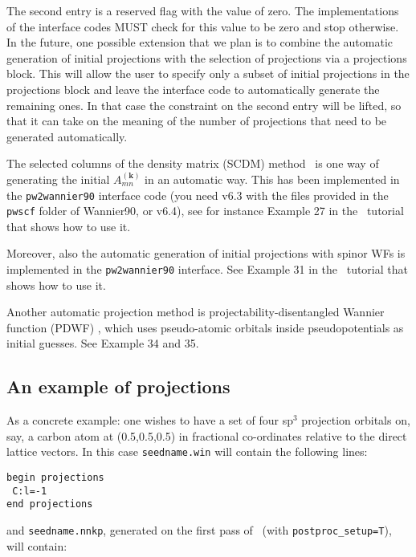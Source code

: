The second entry is a reserved flag with the value of zero. The implementations of the interface codes MUST check for this value to be zero and stop otherwise. In the future, one possible extension that we plan is to combine the automatic generation of initial projections with the selection of projections via a projections block. This will allow the user to specify only a subset of initial projections in the projections block and leave the interface code to automatically generate the remaining ones. In that case the constraint on the second entry will be lifted, so that it can take on the meaning of the number of projections that need to be generated automatically.

The selected columns of the density matrix (SCDM) method~\cite{LinLin-ArXiv2017} is one way of generating the initial $A_{mn}^{(\mathbf{k})}$ in an automatic way. This has been implemented in the {\tt pw2wannier90} interface code (you need v6.3 with the files provided in the \texttt{pwscf} folder of Wannier90, or v6.4), see for instance Example 27 in the \wannier\ tutorial that shows how to use it.

Moreover, also the automatic generation of initial projections with spinor WFs is implemented in the {\tt pw2wannier90} interface. See Example 31 in the \wannier\ tutorial that shows how to use it.

Another automatic projection method is projectability-disentangled Wannier function (PDWF) \cite{Qiao2023-pdwf}, which uses pseudo-atomic orbitals inside pseudopotentials as initial guesses.
See Example 34 and 35.



\subsection{An example of projections}\label{sec:proj_example}

As a concrete example: one wishes to have a set of four sp$^3$ projection
orbitals on, say, a carbon atom at (0.5,0.5,0.5) in fractional
co-ordinates relative to the direct lattice vectors. In this case
\verb#seedname.win# will contain the following lines:

\begin{verbatim}
begin projections
 C:l=-1
end projections
\end{verbatim}

and \verb#seedname.nnkp#, generated on the first pass of
\wannier\ (with \verb#postproc_setup=T#), will contain: 

